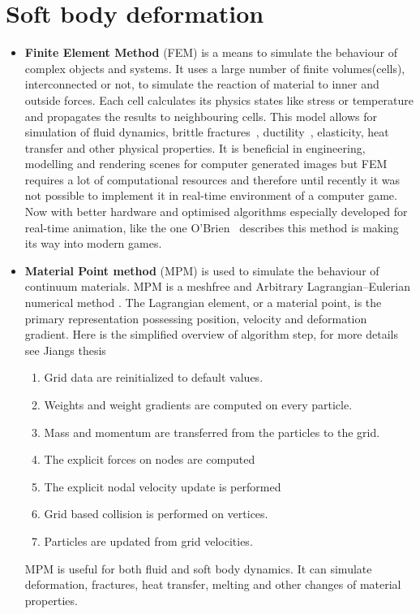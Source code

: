 \section{Soft body deformation}

\begin{itemize}

\item \textbf{Finite Element Method} (FEM) is a means to simulate the behaviour of complex objects and systems.  It uses a large number of finite volumes(cells), interconnected or not, to simulate the reaction of material to inner and outside forces. Each cell calculates its physics states like stress or temperature and propagates the results to neighbouring cells. This model allows for simulation of fluid dynamics, brittle fractures~\cite{brittlefracture}, ductility~\cite{ductilefracture}, elasticity, heat transfer and other physical properties. It is beneficial in engineering, modelling and rendering scenes for computer generated images but FEM requires a lot of computational resources and therefore until recently it was not possible to implement it in real-time environment of a computer game. Now with better hardware and optimised algorithms especially developed for real-time animation, like the one O'Brien~\cite{femingames} describes this method is making its way into modern games.

\item \textbf{Material Point method} (MPM) is used to simulate the behaviour of continuum materials. MPM is a meshfree and Arbitrary Lagrangian–Eulerian numerical method \cite{ALE}. The Lagrangian element, or a material point, is the primary representation possessing position, velocity and deformation gradient. Here is the simplified overview of algorithm step, for more details see Jiangs thesis~\cite{jiang2015material} 
\begin{enumerate}
    \item Grid data are reinitialized to default values.
    \item Weights and weight gradients are computed on every particle.
    \item Mass and momentum are transferred from the particles to the grid.
    \item The explicit forces on nodes are computed
    \item The explicit nodal velocity update is performed
    \item Grid based collision is performed on vertices.
    \item Particles are updated from grid velocities.
\end{enumerate}
MPM is useful for both fluid and soft body dynamics. It can simulate deformation, fractures, heat transfer, melting and other changes of material properties.


\end{itemize}
